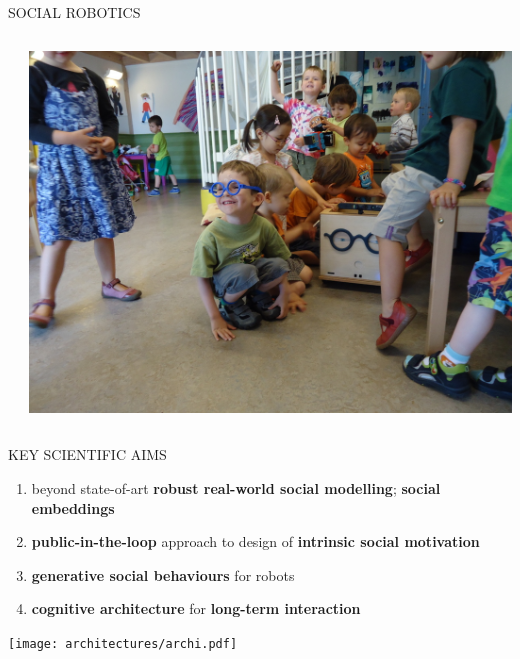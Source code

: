 \documentclass[xcolor=table]{beamer}
\begin{document}
\begin{frame}{SOCIAL ROBOTICS}
\begin{columns}
\begin{column}{0.7\linewidth}
{            }
        \end{column}
        \begin{column}{0.3\linewidth}
            \begin{center}
                \includegraphics[trim=15cm 0 11cm 0,clip,width=\linewidth]{ranger/ranger_funny_glasses}
            \end{center}
        \end{column}
    \end{columns}


\end{frame}

\begin{frame}{KEY SCIENTIFIC AIMS}

    \begin{enumerate}
        \scriptsize
        \item beyond state-of-art \textbf{robust real-world social modelling}; \textbf{social embeddings}
        \item \textbf{public-in-the-loop} approach to design of \textbf{intrinsic social motivation}
        \item \textbf{generative social behaviours} for robots
        \item \textbf{cognitive architecture} for \textbf{long-term interaction}
    \end{enumerate}

    \begin{center}
        \texttt{[image: architectures/archi.pdf]}
    \end{center}
\end{frame}
\end{document}
